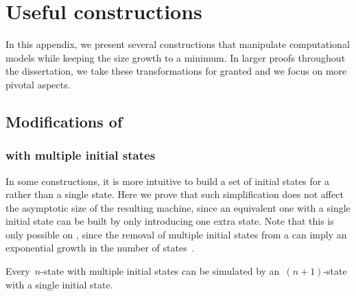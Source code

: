 \chapter{Useful constructions}\label{app:constructions}
In this appendix, we present several constructions that manipulate computational models while keeping the size growth to a minimum.
In larger proofs throughout the dissertation, we take these transformations for granted and we focus on more pivotal aspects.



\section{Modifications of \texorpdfstring{\ONFAs}{1NFAs}}


\subsection{\texorpdfstring{\ONFAs}{1NFAs} with multiple initial states}\label{sub:multistart}
In some constructions, it is more intuitive to build a set of initial states for a \ONFA rather than a single state.
Here we prove that such simplification does not affect the asymptotic size of the resulting machine, since an equivalent one with a single initial state can be built by only introducing one extra state.
Note that this is only possible on \ONFAs, since the removal of multiple initial states from a \ODFA can imply an exponential growth in the number of states~\cite{HolSal+01}.
\begin{thrm}\label{thm:mult-start-states}
	Every~$n$-state \ONFA with multiple initial states can be simulated by an~$(n+1)$-state \ONFA with a single initial state.
\end{thrm}
